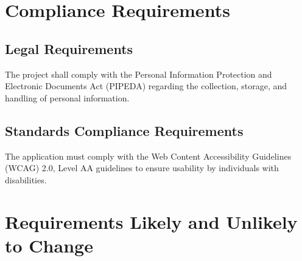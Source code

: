 \documentclass[11pt]{article}
\begin{document}
\section{Compliance Requirements}
\subsection{Legal Requirements}
The project shall comply with the Personal Information Protection and Electronic Documents Act (PIPEDA) regarding the collection, storage, and handling of personal information.

\subsection{Standards Compliance Requirements}
The application must comply with the Web Content Accessibility Guidelines (WCAG) 2.0, Level AA guidelines to ensure usability by individuals with disabilities.

\section{Requirements Likely and Unlikely to Change}
\end{document}
